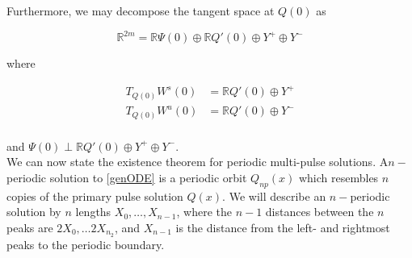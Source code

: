 \documentclass[12pt]{article}
\def\R{{\mathbb R}}
\begin{document}
Furthermore, we may decompose the tangent space at $Q(0)$ as 

\begin{equation}
\R^{2m} = \R \Psi(0) \oplus \R Q'(0) \oplus Y^+ \oplus Y^-
\end{equation}

where

\begin{align*}
T_{Q(0)}W^s(0) &= \R Q'(0) \oplus Y^+ \\
T_{Q(0)}W^u(0) &= \R Q'(0) \oplus Y^- \\
\end{align*}

and $\Psi(0) \perp \R Q'(0) \oplus Y^+ \oplus Y^-$.\\

We can now state the existence theorem for periodic multi-pulse solutions. A$n-$periodic solution to \eqref{genODE} is a periodic orbit $Q_{np}(x)$ which resembles $n$ copies of the primary pulse solution $Q(x)$. We will describe an $n-$periodic solution by $n$ lengths $X_0, \dots, X_{n-1}$, where the $n-1$ distances between the $n$ peaks are $2X_0, \dots 2X_{n_2}$, and $X_{n-1}$ is the distance from the left- and rightmost peaks to the periodic boundary.
\end{document}
